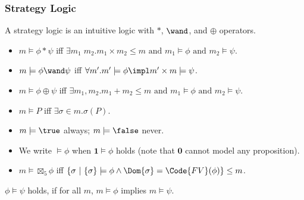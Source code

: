 \begin{frame}[fragile]
    \frametitle{Strategy Logic}

\begin{definition} A strategy logic is an intuitive logic with $*$, $\wand$, and $\oplus$ operators.
\end{definition}
\begin{itemize}
    \item $m \models \phi * \psi$ iff $\exists m_1\; m_2. m_1 \times m_2 \leq m \text{ and } m_1 \models \phi \text{ and } m_2 \models \psi$.
    \item $m \models \phi \wand \psi$ iff $\forall m'. m' \models \phi  \impl m' \times m \models \psi$.
    \item $m \models \phi \oplus \psi$ iff $\exists m_1, m_2. m_1 + m_2 \leq m \text{ and } m_1 \models \phi \text{ and } m_2 \models \psi$.
    \item $m \models P$ iff $\exists \sigma \in m. \sigma(P)$.
    \item $m \models \true$ always; $m \models \false$ never.
    \item We write $\models \phi$ when $\textbf{1} \models \phi$ holds (note that $\textbf{0}$ cannot model any proposition).
\end{itemize}

\begin{definition}
    \begin{itemize}
        \item $m \models \boxtimes_5 \phi$ iff $\{\sigma ~|~ \{\sigma\} \models \phi \land \Dom{\sigma} = \Code{FV}(\phi) \} \leq m$.
    \end{itemize}
\end{definition}

\begin{definition}[Entailment]
    $\phi \models \psi$ holds, if for all $m$, $m \models \phi$ implies $m \models \psi$.
\end{definition}

\end{frame}

